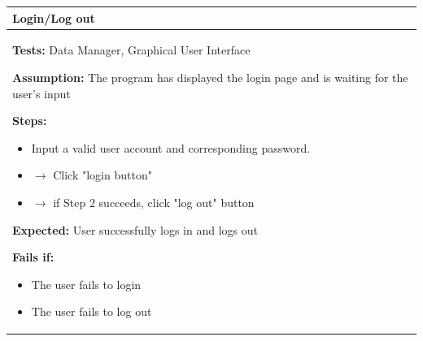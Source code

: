 \documentclass[letterpaper,english, 12pt]{scrreprt}
\begin{document}
\begin{center}
        \begin{tabular}{|C{15cm}|}
                \hline
                        \textbf{Login/Log out}\\
                \hline
                        \begin{flushleft}
                                \textbf{Tests: } Data Manager, Graphical User Interface
                        \end{flushleft}
                        \begin{flushleft}
                                \textbf{Assumption: } The program has displayed the login page and is waiting for the user's input
                        \end{flushleft}
                        \begin{flushleft}
                                \textbf{Steps:}
                        \end{flushleft}
				\begin{itemize}
					\item Input a valid user account and corresponding password.
					\item $\rightarrow$ Click "login button"
					\item $\rightarrow$ if Step 2 succeeds, click "log out" button
				\end{itemize}
			\begin{flushleft}
				\textbf{Expected: } User successfully logs in and logs out
			\end{flushleft}
                        \begin{flushleft}
                                \textbf{Fails if: }
                        \end{flushleft}
                                \begin{itemize}
                                        \item The user fails to login
					\item The user fails to log out
                                \end{itemize}
				\\
		\hline
        \end{tabular}
\end{center}
\end{document}
